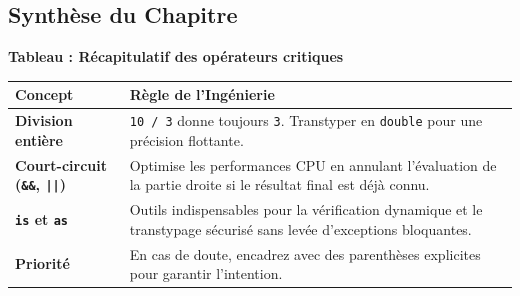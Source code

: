 \subsection{Synthèse du Chapitre}

\begin{center}
    \textbf{Tableau : Récapitulatif des opérateurs critiques} \\[0.3cm]
    \begin{tabular}{@{}lp{10cm}@{}}
        \toprule
        \textbf{Concept} & \textbf{Règle de l'Ingénierie} \\
        \midrule
        \textbf{Division entière} & \texttt{10 / 3} donne toujours \texttt{3}. Transtyper en \texttt{double} pour une précision flottante. \\
        \textbf{Court-circuit (\texttt{\&\&}, \texttt{||})} & Optimise les performances CPU en annulant l'évaluation de la partie droite si le résultat final est déjà connu. \\
        \textbf{\texttt{is} et \texttt{as}} & Outils indispensables pour la vérification dynamique et le transtypage sécurisé sans levée d'exceptions bloquantes. \\
        \textbf{Priorité} & En cas de doute, encadrez avec des parenthèses explicites pour garantir l'intention. \\
        \bottomrule
    \end{tabular}
\end{center}
